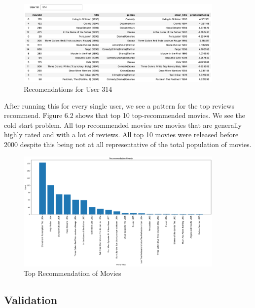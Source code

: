 \documentclass[12pt]{article}
\numberwithin{equation}{section}
\begin{document}
\begin{figure}[h!]
    \begin{minipage}[b]{01\linewidth}
         \centering
  	\includegraphics[width=0.9\textwidth]{314_recs}
  	\caption{Recomendations for User 314}
  	\label{fig:UN_degreeinfo}
    \end{minipage}
\end{figure}

After running this for every single user, we see a pattern for the top reviews recommend. Figure 6.2 shows that top 10 top-recommended movies. We see the cold start problem. All top recommended movies are movies that are generally highly rated and with a lot of reviews. All top 10 movies were released before 2000 despite this being not at all representative of the total population of movies.

\begin{figure}[h!]
    \begin{minipage}[b]{01\linewidth}
         \centering
  	\includegraphics[width=0.9\textwidth]{colab_filter.png}
  	\caption{Top Recommendation of Movies}
  	\label{fig:UN_degreeinfo}
    \end{minipage}
\end{figure}

\subsection{Validation}
\end{document}
